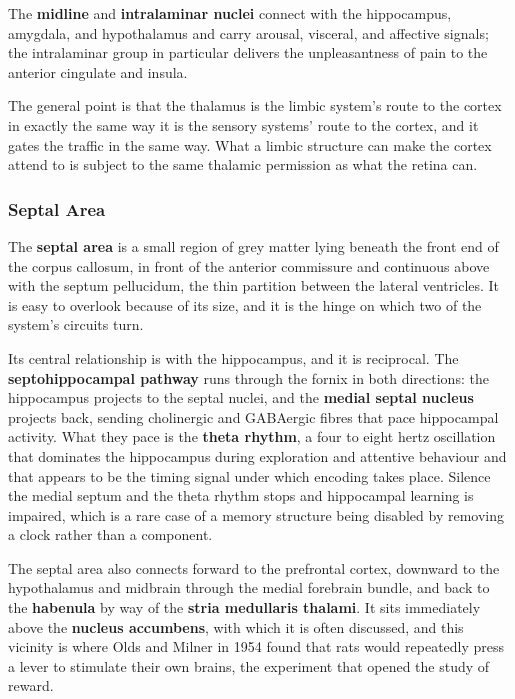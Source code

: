 \documentclass[11pt]{article}
\begin{document}
The \textbf{midline} and \textbf{intralaminar nuclei} connect with the hippocampus, amygdala, and hypothalamus and carry arousal, visceral, and affective signals; the intralaminar group in particular delivers the unpleasantness of pain to the anterior cingulate and insula.

The general point is that the thalamus is the limbic system's route to the cortex in exactly the same way it is the sensory systems' route to the cortex, and it gates the traffic in the same way. What a limbic structure can make the cortex attend to is subject to the same thalamic permission as what the retina can.

\subsubsection{Septal Area}

The \textbf{septal area} is a small region of grey matter lying beneath the front end of the corpus callosum, in front of the anterior commissure and continuous above with the septum pellucidum, the thin partition between the lateral ventricles. It is easy to overlook because of its size, and it is the hinge on which two of the system's circuits turn.

Its central relationship is with the hippocampus, and it is reciprocal. The \textbf{septohippocampal pathway} runs through the fornix in both directions: the hippocampus projects to the septal nuclei, and the \textbf{medial septal nucleus} projects back, sending cholinergic and GABAergic fibres that pace hippocampal activity. What they pace is the \textbf{theta rhythm}, a four to eight hertz oscillation that dominates the hippocampus during exploration and attentive behaviour and that appears to be the timing signal under which encoding takes place. Silence the medial septum and the theta rhythm stops and hippocampal learning is impaired, which is a rare case of a memory structure being disabled by removing a clock rather than a component.

The septal area also connects forward to the prefrontal cortex, downward to the hypothalamus and midbrain through the medial forebrain bundle, and back to the \textbf{habenula} by way of the \textbf{stria medullaris thalami}. It sits immediately above the \textbf{nucleus accumbens}, with which it is often discussed, and this vicinity is where Olds and Milner in 1954 found that rats would repeatedly press a lever to stimulate their own brains, the experiment that opened the study of reward.
\end{document}
